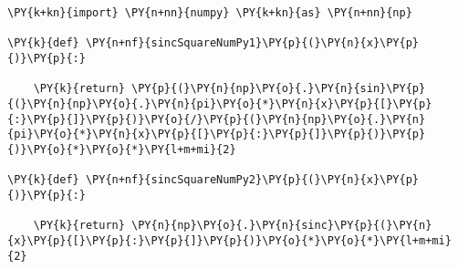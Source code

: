 \begin{Verbatim}[commandchars=\\\{\}]
\PY{k+kn}{import} \PY{n+nn}{numpy} \PY{k+kn}{as} \PY{n+nn}{np}

\PY{k}{def} \PY{n+nf}{sincSquareNumPy1}\PY{p}{(}\PY{n}{x}\PY{p}{)}\PY{p}{:}

    \PY{k}{return} \PY{p}{(}\PY{n}{np}\PY{o}{.}\PY{n}{sin}\PY{p}{(}\PY{n}{np}\PY{o}{.}\PY{n}{pi}\PY{o}{*}\PY{n}{x}\PY{p}{[}\PY{p}{:}\PY{p}{]}\PY{p}{)}\PY{o}{/}\PY{p}{(}\PY{n}{np}\PY{o}{.}\PY{n}{pi}\PY{o}{*}\PY{n}{x}\PY{p}{[}\PY{p}{:}\PY{p}{]}\PY{p}{)}\PY{p}{)}\PY{o}{*}\PY{o}{*}\PY{l+m+mi}{2}

\PY{k}{def} \PY{n+nf}{sincSquareNumPy2}\PY{p}{(}\PY{n}{x}\PY{p}{)}\PY{p}{:}

    \PY{k}{return} \PY{n}{np}\PY{o}{.}\PY{n}{sinc}\PY{p}{(}\PY{n}{x}\PY{p}{[}\PY{p}{:}\PY{p}{]}\PY{p}{)}\PY{o}{*}\PY{o}{*}\PY{l+m+mi}{2}
\end{Verbatim}
